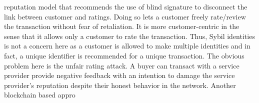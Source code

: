 reputation model that recommends the use of blind signature to disconnect
the link between customer and ratings. Doing so lets a customer freely
rate/review the transaction without fear of retaliation. It is more
customer-centric in the sense that it allows only a customer to rate the
transaction. Thus, Sybil identities is not a concern here as a customer is
allowed to make multiple identities and in fact, a unique identifier is
recommended for a unique transaction. The obvious problem here is the unfair
rating attack. A buyer can transact with a service provider provide negative
feedback with an intention to damage the service provider's reputation despite
their honest behavior in the network. 
Another blockchain based appro
\cite{dennis2015rep} 


%


